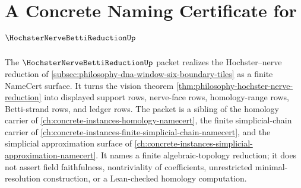 \chapter{A Concrete Naming Certificate for $\HochsterNerveBettiReductionUp$}
\label{ch:concrete-instances-hochster-nerve-betti-reduction-namecert}

The $\HochsterNerveBettiReductionUp$ packet realizes the Hochster--nerve reduction of \autoref{subsec:philosophy-dna-window-six-boundary-tiles} as a finite NameCert surface. It turns the vision theorem \autoref{thm:philosophy-hochster-nerve-reduction} into displayed support rows, nerve-face rows, homology-range rows, Betti-strand rows, and ledger rows. The packet is a sibling of the homology carrier of \autoref{ch:concrete-instances-homology-namecert}, the finite simplicial-chain carrier of \autoref{ch:concrete-instances-finite-simplicial-chain-namecert}, and the simplicial approximation surface of \autoref{ch:concrete-instances-simplicial-approximation-namecert}. It names a finite algebraic-topology reduction; it does not assert field faithfulness, nontriviality of coefficients, unrestricted minimal-resolution construction, or a Lean-checked homology computation.

